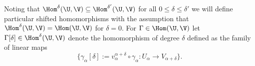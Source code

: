 Noting that $\Hom^\delta(\U,\V)\subseteq\Hom^{\delta'}(\U,\V)$ for all $0\leq\delta\leq\delta'$ we will define particular shifted homomorphisms with the assumption that $\Hom^\delta(\U,\V) = \Hom(\U,\V)$ for $\delta = 0$.
For $\Gamma\in\Hom(\U,\V)$ let $\Gamma[\delta]\in\Hom^\delta(\U,\V)$ denote the homomorphism of degree $\delta$ defined as the family of linear maps
\[\{\gamma_\alpha[\delta] := v_\alpha^{\alpha+\delta}\circ \gamma_\alpha : U_\alpha\to V_{\alpha+\delta}\}.\]



